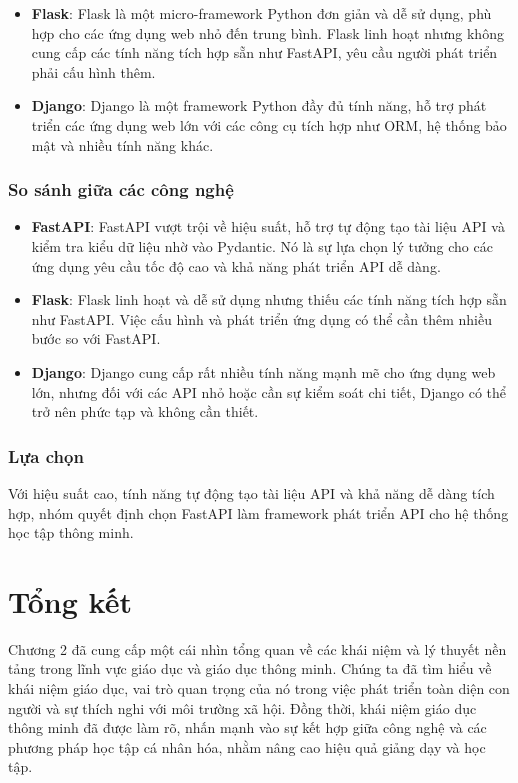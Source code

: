 \begin{itemize} \item \textbf{Flask}: Flask là một micro-framework Python đơn giản và dễ sử dụng, phù hợp cho các ứng dụng web nhỏ đến trung bình. Flask linh hoạt nhưng không cung cấp các tính năng tích hợp sẵn như FastAPI, yêu cầu người phát triển phải cấu hình thêm. \item \textbf{Django}: Django là một framework Python đầy đủ tính năng, hỗ trợ phát triển các ứng dụng web lớn với các công cụ tích hợp như ORM, hệ thống bảo mật và nhiều tính năng khác. \end{itemize}

\subsubsection{So sánh giữa các công nghệ}

\begin{itemize} \item \textbf{FastAPI}: FastAPI vượt trội về hiệu suất, hỗ trợ tự động tạo tài liệu API và kiểm tra kiểu dữ liệu nhờ vào Pydantic. Nó là sự lựa chọn lý tưởng cho các ứng dụng yêu cầu tốc độ cao và khả năng phát triển API dễ dàng. \item \textbf{Flask}: Flask linh hoạt và dễ sử dụng nhưng thiếu các tính năng tích hợp sẵn như FastAPI. Việc cấu hình và phát triển ứng dụng có thể cần thêm nhiều bước so với FastAPI. \item \textbf{Django}: Django cung cấp rất nhiều tính năng mạnh mẽ cho ứng dụng web lớn, nhưng đối với các API nhỏ hoặc cần sự kiểm soát chi tiết, Django có thể trở nên phức tạp và không cần thiết. \end{itemize}

\subsubsection{Lựa chọn}

Với hiệu suất cao, tính năng tự động tạo tài liệu API và khả năng dễ dàng tích hợp, nhóm quyết định chọn FastAPI làm framework phát triển API cho hệ thống học tập thông minh.
\section{Tổng kết}
\par Chương 2 đã cung cấp một cái nhìn tổng quan về các khái niệm và lý thuyết nền tảng trong lĩnh vực giáo dục và giáo dục thông minh. Chúng ta đã tìm hiểu về khái niệm giáo dục, vai trò quan trọng của nó trong việc phát triển toàn diện con người và sự thích nghi với môi trường xã hội. Đồng thời, khái niệm giáo dục thông minh đã được làm rõ, nhấn mạnh vào sự kết hợp giữa công nghệ và các phương pháp học tập cá nhân hóa, nhằm nâng cao hiệu quả giảng dạy và học tập.

